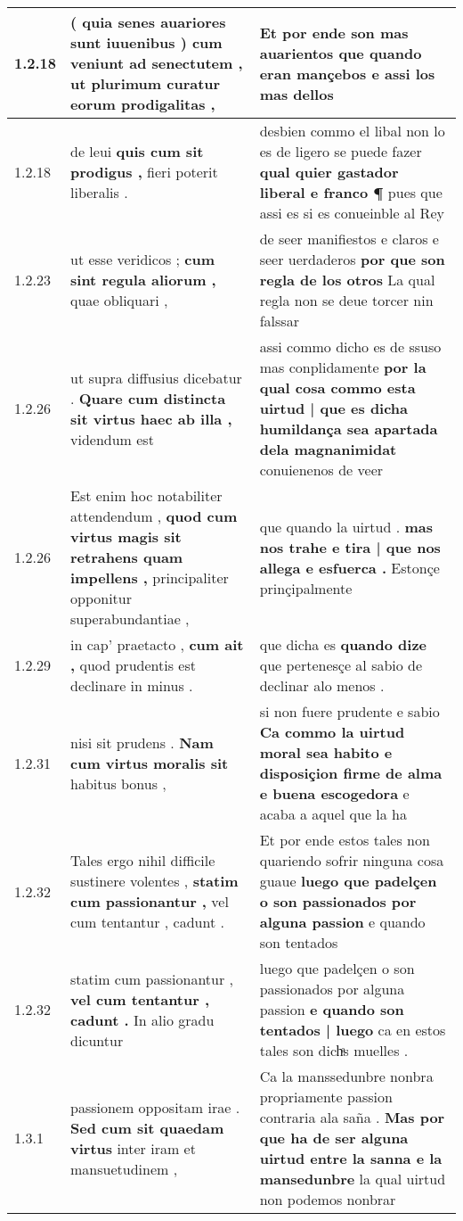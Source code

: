 \begin{tabular}{|p{1cm}|p{6.5cm}|p{6.5cm}|}
1.2.18 & ( quia senes auariores sunt iuuenibus ) \textbf{ cum veniunt ad senectutem , } ut plurimum curatur eorum prodigalitas , & Et por ende son mas auarientos \textbf{ que quando eran mançebos } e assi los mas dellos \\\hline
1.2.18 & de leui \textbf{ quis cum sit prodigus , } fieri poterit liberalis . & desbien commo el libal non lo es de ligero se puede fazer \textbf{ qual quier gastador liberal e franco ¶ } pues que assi es si es conueinble al Rey \\\hline
1.2.23 & ut esse veridicos ; \textbf{ cum sint regula aliorum , } quae obliquari , & de seer manifiestos e claros e seer uerdaderos \textbf{ por que son regla de los otros } La qual regla non se deue torcer nin falssar \\\hline
1.2.26 & ut supra diffusius dicebatur . \textbf{ Quare cum distincta sit virtus haec ab illa , } videndum est & assi commo dicho es de ssuso mas conplidamente \textbf{ por la qual cosa commo esta uirtud | que es dicha humildança sea apartada dela magnanimidat } conuienenos de veer \\\hline
1.2.26 & Est enim hoc notabiliter attendendum , \textbf{ quod cum virtus magis sit retrahens quam impellens , } principaliter opponitur superabundantiae , & que quando la uirtud . \textbf{ mas nos trahe e tira | que nos allega e esfuerca . } Estonçe prinçipalmente \\\hline
1.2.29 & in cap’ praetacto , \textbf{ cum ait , } quod prudentis est declinare in minus . & que dicha es \textbf{ quando dize } que pertenesçe al sabio de declinar alo menos . \\\hline
1.2.31 & nisi sit prudens . \textbf{ Nam cum virtus moralis sit } habitus bonus , & si non fuere prudente e sabio \textbf{ Ca commo la uirtud moral sea habito e disposiçion firme de alma e buena escogedora } e acaba a aquel que la ha \\\hline
1.2.32 & Tales ergo nihil difficile sustinere volentes , \textbf{ statim cum passionantur , } vel cum tentantur , cadunt . & Et por ende estos tales non quariendo sofrir ninguna cosa guaue \textbf{ luego que padelçen o son passionados por alguna passion } e quando son tentados \\\hline
1.2.32 & statim cum passionantur , \textbf{ vel cum tentantur , cadunt . } In alio gradu dicuntur & luego que padelçen o son passionados por alguna passion \textbf{ e quando son tentados | luego } ca en estos tales son dichͣs muelles . \\\hline
1.3.1 & passionem oppositam irae . \textbf{ Sed cum sit quaedam virtus } inter iram et mansuetudinem , & Ca la manssedunbre nonbra propriamente passion contraria ala saña . \textbf{ Mas por que ha de ser alguna uirtud entre la sanna e la mansedunbre } la qual uirtud non podemos nonbrar \\\hline

\end{tabular}
